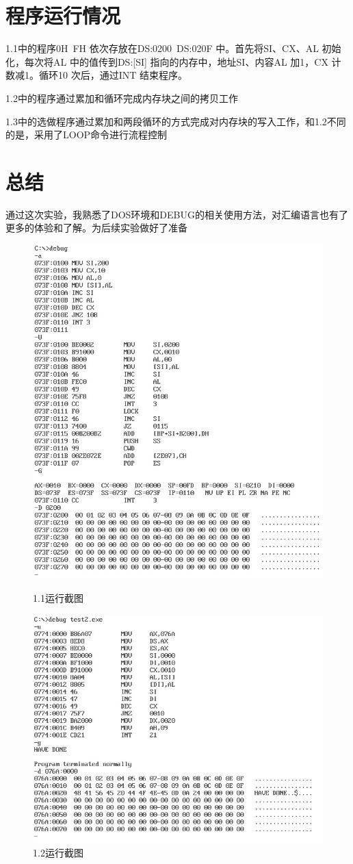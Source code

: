 \documentclass[UTF8,a4paper]{ctexart}
\begin{document}
\section{程序运行情况}
1.1中的程序0H~FH 依次存放在DS:0200~DS:020F 中。首先将SI、CX、AL 初始化，每次将AL 中的值传到DS:[SI] 指向的内存中，地址SI、内容AL 加1，CX 计数减1。循环10 次后，通过INT 结束程序。

1.2中的程序通过累加和循环完成内存块之间的拷贝工作

1.3中的选做程序通过累加和两段循环的方式完成对内存块的写入工作，和1.2不同的是，采用了LOOP命令进行流程控制
\section{总结}
通过这次实验，我熟悉了DOS环境和DEBUG的相关使用方法，对汇编语言也有了更多的体验和了解。为后续实验做好了准备
\begin{figure}
\centering
\includegraphics[width=\textwidth]{1-2.jpg}
\caption{1.1运行截图}
\includegraphics[width=\textwidth]{1-3.jpg}
\caption{1.2运行截图}
\end{figure}
\end{document}
